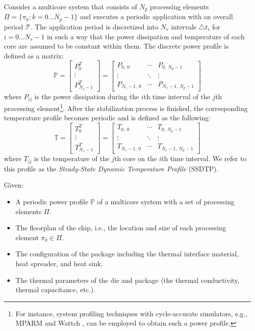 Consider a multicore system that consists of $N_p$ processing elements $\Pi = \{ \pi_k: k = 0 \dots N_p - 1 \}$ and executes a periodic application with an overall period $\mathcal{T}$. The application period is discretized into $N_s$ intervals $\triangle t_i$ for $i = 0 \dots N_s - 1$ in such a way that the power dissipation and temperature of each core are assumed to be constant within them. The discrete power profile is defined as a matrix:
\begin{equation*}
  \mathbb{P} = \left[
    \begin{array}{c}
      P_0^T \\
      \vdots \\
      P_{N_s - 1}^T
    \end{array}
  \right] = \left[
    \begin{array}{ccc}
      P_{0, \: 0} & \cdots & P_{0, \: N_p - 1} \\
      \vdots & \ddots & \vdots \\
      P_{N_s - 1, \: 0} & \cdots & P_{N_s - 1, \: N_p - 1}
    \end{array}
  \right]
\end{equation*}
where $P_{ij}$ is the power dissipation during the $i$th time interval of the $j$th processing element\footnote{For instance, system profiling techniques with cycle-accurate simulators, e.g., MPARM \cite{benini2005} and Wattch \cite{brooks2000}, can be employed to obtain such a power profile.}. After the stabilization process is finished, the corresponding temperature profile becomes periodic and is defined as the following:
\begin{equation*}
  \mathbb{T} = \left[
    \begin{array}{c}
      T_0^T \\
      \vdots \\
      T_{N_s - 1}^T
    \end{array}
  \right] = \left[
    \begin{array}{ccc}
      T_{0, \: 0} & \cdots & T_{0, \: N_p - 1} \\
      \vdots & \ddots & \vdots \\
      T_{N_s - 1, \: 0} & \cdots & T_{N_s - 1, \: N_p - 1}
    \end{array}
  \right]
\end{equation*}
where $T_{ij}$ is the temperature of the $j$th core on the $i$th time interval. We refer to this profile as the \emph{Steady-State Dynamic Temperature Profile} (SSDTP).

Given:
\begin{itemize}
  \item A periodic power profile $\mathbb{P}$ of a multicore system with a set of processing elements $\Pi$.
  \item The floorplan of the chip, i.e., the location and size of each processing element $\pi_k \in \Pi$.
  \item The configuration of the package including the thermal interface material, heat spreader, and heat sink.
  \item The thermal parameters of the die and package (the thermal conductivity, thermal capacitance, etc.).
\end{itemize}

